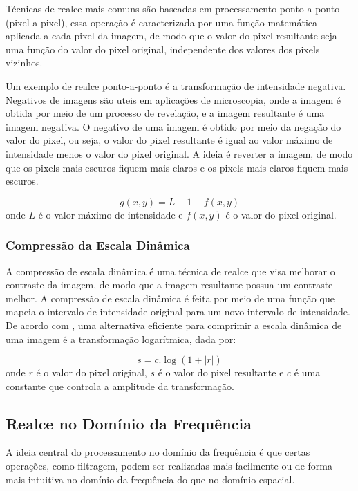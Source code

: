 \documentclass[conference]{IEEEtran}
\begin{document}
Técnicas de realce mais comuns são baseadas em processamento ponto-a-ponto (pixel a pixel), essa operação é 
caracterizada por uma função matemática aplicada a cada pixel da imagem, de modo que o valor do pixel resultante 
seja uma função do valor do pixel original, independente dos valores dos pixels vizinhos. 

Um exemplo de realce ponto-a-ponto é a transformação de intensidade negativa. Negativos de imagens são uteis em 
aplicações de microscopia, onde a imagem é obtida por meio de um processo de revelação, e a imagem resultante é 
uma imagem negativa. O negativo de uma imagem é obtido por meio da negação do valor do pixel, ou seja, o valor do 
pixel resultante é igual ao valor máximo de intensidade menos o valor do pixel original. 
A ideia é reverter a imagem, de modo que os pixels mais escuros fiquem mais claros e os pixels mais claros fiquem 
mais escuros.

\begin{equation}
g(x, y) = L - 1 - f(x, y)
\label{eq:neg_img}
\end{equation}
onde $L$ é o valor máximo de intensidade e $f(x,y)$ é o valor do pixel original.

\subsubsection{Compressão da Escala Dinâmica}

A compressão de escala dinâmica é uma técnica de realce que visa melhorar o contraste da imagem, 
de modo que a imagem resultante possua um contraste melhor. 
A compressão de escala dinâmica é feita por meio de uma função que mapeia o intervalo de intensidade original para 
um novo intervalo de intensidade. De acordo com \cite{gonzalez2000}, 
uma alternativa eficiente para comprimir a escala dinâmica de uma imagem é a transformação logarítmica, dada por:

\begin{equation}
s = c . \log(1 + |r|)
\label{eq:ecl_din}
\end{equation}
onde $r$ é o valor do pixel original, $s$ é o valor do pixel resultante e $c$ é uma constante que 
controla a amplitude da transformação.

\subsection{Realce no Domínio da Frequência}
A ideia central do processamento no domínio da frequência é que certas operações, como filtragem, 
podem ser realizadas mais facilmente ou de forma mais intuitiva no domínio da frequência do que no domínio espacial.
\cite{gonzalez2000}
\end{document}
